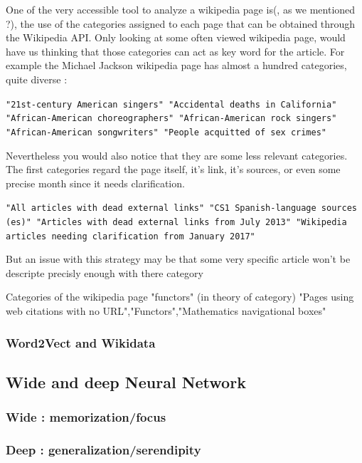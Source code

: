\documentclass[11pt]{article}
\theoremstyle{plain}
\theoremstyle{definition}
\theoremstyle{remark}
\begin{document}
One of the very accessible tool to analyze a wikipedia page is(, as we mentioned ?), the use of the categories assigned to each page that can be obtained through the Wikipedia API.
Only looking at some often viewed wikipedia page, would have us thinking that those categories can act as key word for the article. For example the Michael Jackson wikipedia page has almost a hundred categories, quite diverse :
 \begin{center}
	\texttt{"21st-century American singers" "Accidental deaths in California" "African-American choreographers" "African-American rock singers" "African-American songwriters"  "People acquitted of sex crimes"}
 \end{center}

Nevertheless you would also notice that they are some less relevant categories. The first categories regard the page itself, it's link, it's sources, or even some precise month since it needs clarification.

 \begin{center}
	\texttt{"All articles with dead external links" "CS1 Spanish-language sources (es)" "Articles with dead external links from July 2013" "Wikipedia articles needing clarification from January 2017"}
 \end{center}
But an issue with this strategy may be that some very specific article won't be descripte precisly enough with there category 


Categories of the wikipedia page "functors" (in theory of category)
"Pages using web citations with no URL","Functors","Mathematics navigational boxes"

\subsubsection{Word2Vect and Wikidata}

\subsection{Wide and deep Neural Network}
\subsubsection{Wide : memorization/focus}
\subsubsection{Deep : generalization/serendipity}


\newpage
\end{document}
